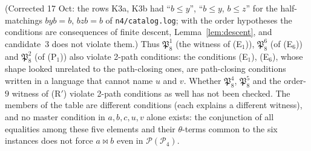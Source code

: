 \documentclass[11pt]{amsart}
\theoremstyle{definition}
\renewcommand{\P}{\mathcal{P}}
\newcommand{\mt}{\bowtie}   %
\begin{document}
(Corrected 17 Oct: the rows K3a, K3b had ``$b\le y$'', ``$b\le y$, $b\le z$'' for the half-matchings $byb=b$, $bzb=b$ of \texttt{n4/catalog.log}; with the order hypotheses the conditions are consequences of finite descent, Lemma~\ref{lem:descent}, and candidate~$3$ does not violate them.) Thus $\mathfrak P_8^1$ (the witness of (E$_1$)), $\mathfrak P_8^6$ (of (E$_6$)) and $\mathfrak P_8^2$ (of (P$_1$)) also violate 2-path conditions: the conditions (E$_1$), (E$_6$), whose shape looked unrelated to the path-closing ones, are path-closing conditions written in a language that cannot name $u$ and $v$. Whether $\mathfrak P_8^4$, $\mathfrak P_8^5$ and the order-$9$ witness of (R$'$) violate 2-path conditions as well has not been checked. The members of the table are different conditions (each explains a different witness), and no master condition in $a,b,c,u,v$ alone exists: the conjunction of all equalities among these five elements and their $\theta$-terms common to the six instances does not force $a\mt b$ even in $\P(\P_4)$.
\end{document}
